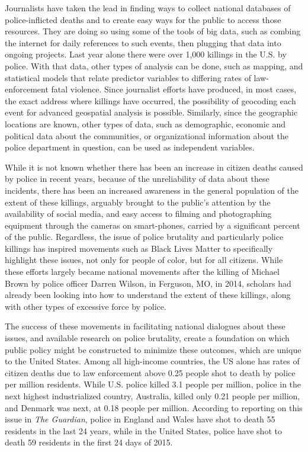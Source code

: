 \documentclass[sigconf]{acmart}
\begin{document}
Journalists have taken the lead in finding ways to collect national databases of police-inflicted deaths and to create easy ways for the public to access those resources. \cite{currie16,nix17,counted,fatalforce} They are doing so using some of the tools of big data, such as combing the internet for daily references to such events, then plugging that data into ongoing projects.  Last year alone there were over 1,000 killings in the U.S. by police. \cite{counted}  With that data, other types of analysis can be done, such as mapping, and statistical models that relate predictor variables to differing rates of law-enforcement fatal violence.  Since journalist efforts have produced, in most cases, the exact address where killings have occurred, the possibility of geocoding each event for advanced geospatial analysis is possible. \cite{dalton17}  Similarly, since the geographic locations are known, other types of data, such as demographic, economic and political data about the communities, or organizational information about the police department in question, can be used as independent variables. \cite{smith04,legewie15}

While it is not known whether there has been an increase in citizen deaths caused by police in recent years, because of the unreliability of data about these incidents, there has been an increased awareness in the general population of the extent of these killings, arguably brought to the public's attention by the availability of social media, and easy access to filming and photographing equipment through the cameras on smart-phones, carried by a significant percent of the public. \cite{bonilla15,brucato15,nix17}  Regardless, the issue of police brutality and particularly police killings has inspired movements such as Black Lives Matter to specifically highlight these issues, not only for people of color, but for all citizens.  While these efforts largely became national movements after the killing of Michael Brown by police officer Darren Wilson, in Ferguson, MO, in 2014, scholars had already been looking into how to understand the extent of these killings, along with other types of excessive force by police. \cite{smith04,smith14,meeks06,schneider14,chaney13,holmes00}  

The success of these movements in facilitating national dialogues about these issues, and available research on police brutality, create a foundation on which public policy might be constructed to minimize these outcomes, which are unique to the United States. Among all high-income countries, the US alone has rates of citizen deaths due to law enforcement above 0.25 people shot to death by police per million residents.  While U.S. police killed 3.1 people per million, police in the next highest industrialized country, Australia, killed only 0.21 people per million, and Denmark was next, at 0.18 people per million. \cite{ser16}  According to reporting on this issue in {\em The Guardian}, police in England and Wales have shot to death 55 residents in the last 24 years, while in the United States, police have shot to death 59 residents in the first 24 days of 2015. \cite{lartey15} 
\end{document}
